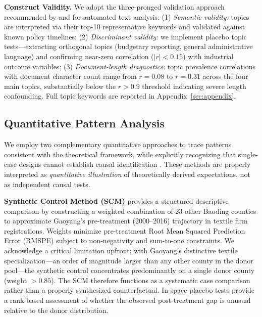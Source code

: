 \documentclass[a4paper, twoside, final]{article}
\begin{document}
\textbf{Construct Validity.} We adopt the three-pronged validation approach recommended by \citet{Grimmer2013} and \citet{Gentzkow2019} for automated text analysis: (1) \emph{Semantic validity:} topics are interpreted via their top-10 representative keywords and validated against known policy timelines; (2) \emph{Discriminant validity:} we implement placebo topic tests---extracting orthogonal topics (budgetary reporting, general administrative language) and confirming near-zero correlation ($|r| < 0.15$) with industrial outcome variables; (3) \emph{Document-length diagnostics:} topic prevalence correlations with document character count range from $r=0.08$ to $r=0.31$ across the four main topics, substantially below the $r>0.9$ threshold indicating severe length confounding. Full topic keywords are reported in Appendix~\ref{sec:appendix}.

\subsection{Quantitative Pattern Analysis}\label{sec:quant}
We employ two complementary quantitative approaches to trace patterns consistent with the theoretical framework, while explicitly recognizing that single-case designs cannot establish causal identification \citep{Cai2016}. These methods are properly interpreted as \emph{quantitative illustration} of theoretically derived expectations, not as independent causal tests.

\textbf{Synthetic Control Method (SCM)} \citep{Abadie2010} provides a structured descriptive comparison by constructing a weighted combination of 23 other Baoding counties to approximate Gaoyang's pre-treatment (2000--2016) trajectory in textile firm registrations. Weights minimize pre-treatment Root Mean Squared Prediction Error (RMSPE) subject to non-negativity and sum-to-one constraints. We acknowledge a critical limitation upfront: with Gaoyang's distinctive textile specialization---an order of magnitude larger than any other county in the donor pool---the synthetic control concentrates predominantly on a single donor county (weight $>0.85$). The SCM therefore functions as a systematic case comparison rather than a properly synthesized counterfactual. In-space placebo tests \citep{Ludbrook1998} provide a rank-based assessment of whether the observed post-treatment gap is unusual relative to the donor distribution.
\end{document}
